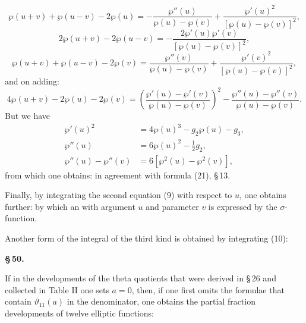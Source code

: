 
\[
\wp(u+v) + \wp(u-v) - 2\wp(u) = -\dfrac{\wp''(u)}{\wp(u)-\wp(v)} + \dfrac{\wp'(u)^2}{[\wp(u)-\wp(v)]^2},
\]
\[
2\wp(u+v) - 2\wp(u-v) = -\dfrac{2\wp'(u)\wp'(v)}{[\wp(u)-\wp(v)]^2},
\]
\[
\wp(u+v) + \wp(u-v) - 2\wp(v) = \dfrac{\wp''(v)}{\wp(u)-\wp(v)} + \dfrac{\wp'(v)^2}{[\wp(u)-\wp(v)]^2},
\]
and on adding:
\[
4\wp(u+v) - 2\wp(u) - 2\wp(v) = \left(\dfrac{\wp'(u)-\wp'(v)}{\wp(u)-\wp(v)}\right)^2 - \dfrac{\wp''(u)-\wp''(v)}{\wp(u)-\wp(v)}.
\]
But we have
\[
\begin{aligned}
\wp'(u)^2 &= 4\wp(u)^3 - g_2\wp(u) - g_3, \\
\wp''(u) &= 6\wp(u)^2 - \tfrac{1}{2}g_2, \\
\wp''(u) - \wp''(v) &= 6\left[\wp^2(u) - \wp^2(v)\right],
\end{aligned}
\]
from which one obtains:
in agreement with formula (21), \S\,13.

Finally, by integrating the second equation (9) with
respect to $u$, one obtains further:
by which an  with argument $u$
and parameter $v$ is expressed by the $\sigma$-function.

Another form of the integral of the third kind is obtained
by integrating (10):

\begin{center}
\textbf{\S\,50. }
\end{center}

If in the developments of the theta quotients that were
derived in \S\,26 and collected in Table II one sets
$a=0$, then, if one first omits the formulae that contain
$\vartheta_{11}(a)$ in the denominator, one obtains the partial fraction developments
 of twelve elliptic functions:
